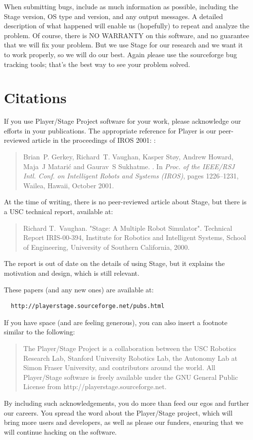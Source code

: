 \documentclass[letter,11pt,twoside]{report}
\begin{document}
When submitting bugs, include as much information as possible,
including the Stage version, OS type and version, and any output
messages.  A detailed description of what happened will enable us
(hopefully) to repeat and analyze the problem.  Of course, there
is NO WARRANTY on this software, and no guarantee that we will fix
your problem.  But we use Stage for our research and we want it to
work properly, so we will do our best. Again {\emph please use the
  sourceforge bug tracking tools}; that's the best way to see your
problem solved.

\section{Citations}
If you use Player/Stage Project software for your work, please
acknowledge our efforts in your publications. The appropriate
reference for Player is our peer-reviewed article in the proceedings
of IROS 2001: \cite{GerkeyVaughan01a}:
\begin{quote}
  Brian~P. Gerkey, Richard~T. Vaughan, Kasper St\o{}y, Andrew Howard,
  Maja~J Matari\'c and Gaurav~S Sukhatme.
  .
  \newblock In {\em Proc. of the IEEE/RSJ Intl. Conf. on Intelligent Robots and
    Systems (IROS)}, pages 1226--1231, Wailea, Hawaii, October 2001.
\end{quote}

At the time of writing, there is no peer-reviewed article about Stage,
but there is a USC technical report, available at:

\begin{quote}
  Richard T.~Vaughan. "Stage: A Multiple Robot Simulator". Technical Report IRIS-00-394, Institute for Robotics and Intelligent Systems, School of Engineering, University of Southern California, 2000.
\end{quote}

The report is out of date on the details of using Stage, but it
explains the motivation and design, which is still relevant.

These papers (and any new ones) are available at: 

\begin{verbatim}
  http://playerstage.sourceforge.net/pubs.html
\end{verbatim}

If you have space (and are feeling generous), you can also insert a footnote
similar to the following:
\begin{quote}
  The Player/Stage Project is a collaboration between the USC Robotics
  Research Lab, Stanford University Robotics Lab, the Autonomy Lab at
  Simon Fraser University, and contributors around the world. All
  Player/Stage software is freely available under the GNU General Public
  License from http://playerstage.sourceforge.net.
\end{quote}
By including such acknowledgements, you do more than feed our egos and
further our careers.  You spread the word about the Player/Stage
project, which will bring more users and developers, as well as please
our funders, ensuring that we will continue hacking on the software.
\end{document}

